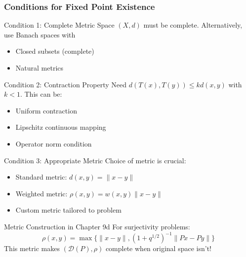 \documentclass[aspectratio=169,10pt]{beamer}
\begin{document}
\begin{frame}[allowframebreaks]
    \frametitle{Conditions for Fixed Point Existence}

    \begin{block}{Condition 1: Complete Metric Space}
        $(X, d)$ must be complete. Alternatively, use Banach spaces with
        \begin{itemize}
            \item Closed subsets (complete)
            \item Natural metrics
        \end{itemize}
    \end{block}

    \begin{block}{Condition 2: Contraction Property}
        Need $d(T(x), T(y)) \leq kd(x,y)$ with $k < 1$. This can be:
        \begin{itemize}
            \item Uniform contraction
            \item Lipschitz continuous mapping
            \item Operator norm condition
        \end{itemize}
    \end{block}

    \begin{block}{Condition 3: Appropriate Metric}
        Choice of metric is crucial:
        \begin{itemize}
            \item Standard metric: $d(x,y) = \|x - y\|$
            \item Weighted metric: $\rho(x,y) = w(x,y)\|x-y\|$
            \item Custom metric tailored to problem
        \end{itemize}
    \end{block}

    \framebreak

    \begin{block}{Metric Construction in Chapter 9d}
        For surjectivity problems:
        \[
        \rho(x,y) = \max\{\|x-y\|, (1+q^{1/2})^{-1}\|Px - Py\|\}
        \]
        This metric makes $(\mathcal{D}(P), \rho)$ complete when original space isn't!
    \end{block}
\end{frame}

\end{document}
